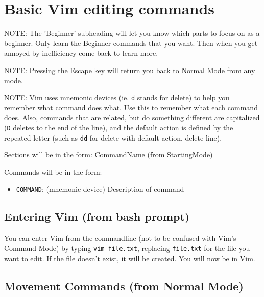 \documentclass[11pt]{article}
\begin{document}
\section{Basic Vim editing commands}
\label{sec:org4ca8a30}
NOTE: The 'Beginner' subheading will let you know which parts to focus on as a
beginner. Only learn the Beginner commands that you want. Then when you get
annoyed by inefficiency come back to learn more.

NOTE: Pressing the Escape key will return you back to Normal Mode from any mode.

NOTE: Vim uses mnemonic devices (ie. \texttt{d} stands for delete) to help you remember
what command does what. Use this to remember what each command does. Also,
commands that are related, but do something different are capitalized (\texttt{D}
deletes to the end of the line), and the default action is defined by the
repeated letter (such as \texttt{dd} for delete with default action, delete line).

Sections will be in the form: CommandName (from StartingMode)

Commands will be in the form:
\begin{itemize}
\item \texttt{COMMAND}: (mnemonic device) Description of command
\end{itemize}
\subsection{Entering Vim (from bash prompt)}
\label{sec:org11bee02}
You can enter Vim from the commandline (not to be confused with Vim's Command
Mode) by typing \texttt{vim file.txt}, replacing \texttt{file.txt} for the file you want to
edit. If the file doesn't exist, it will be created. You will now be in Vim.
\subsection{Movement Commands (from Normal Mode)}
\label{sec:orgb6555e3}
\end{document}

